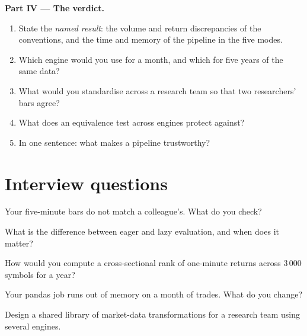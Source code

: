 \begin{problem}
\medskip\noindent\textbf{Part IV --- The verdict.}
\begin{enumerate}[resume]
\item State the \emph{named result}: the volume and return discrepancies of the conventions, and the time and memory of the pipeline in
the five modes.
\item Which engine would you use for a month, and which for five years of the same data?
\item What would you standardise across a research team so that two researchers' bars agree?
\item What does an equivalence test across engines protect against?
\item In one sentence: what makes a  pipeline trustworthy?
\end{enumerate}
\end{problem}

\section{Interview questions}

\begin{interviewq}\label{iq:pl:dataframes:1}
Your five-minute bars do not match a colleague's. What do you check?
\end{interviewq}

\begin{interviewq}\label{iq:pl:dataframes:2}
What is the difference between eager and lazy  evaluation, and when does it matter?
\end{interviewq}

\begin{interviewq}\label{iq:pl:dataframes:3}
How would you compute a cross-sectional rank of one-minute returns across 3\,000 symbols for a year?
\end{interviewq}

\begin{interviewq}\label{iq:pl:dataframes:4}
Your pandas job runs out of memory on a month of trades. What do you change?
\end{interviewq}

\begin{interviewq}\label{iq:pl:dataframes:5}
Design a shared library of market-data transformations for a research team using several  engines.
\end{interviewq}
